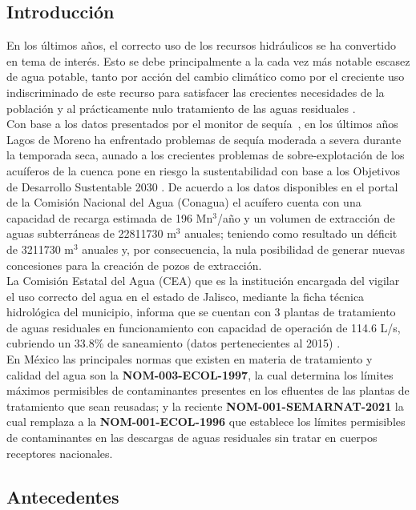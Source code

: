 \subsection*{Introducción}
En los últimos años, el correcto uso de los recursos hidráulicos se ha convertido en tema de interés. Esto se debe principalmente a la cada vez más notable escasez de agua potable, tanto por acción del cambio climático como por el creciente uso indiscriminado de este recurso para satisfacer las crecientes necesidades de la población y al prácticamente nulo tratamiento de las aguas residuales \emph{\citep{informeods2021, aa2030}}.\\
Con base a los datos presentados por el monitor de sequía~\emph{\citep{msm}}, en los últimos años Lagos de Moreno ha enfrentado problemas de sequía moderada a severa durante la temporada seca, aunado a los crecientes problemas de sobre-explotación de los acuíferos de la cuenca pone en riesgo la sustentabilidad con base a los Objetivos de Desarrollo Sustentable 2030 \emph{\citep{aa2030}}. De acuerdo a los datos disponibles en el portal de la Comisión Nacional del Agua (Conagua) \emph{\citep{acuiferolag}} el acuífero cuenta con una capacidad de recarga estimada de 196 Mn$^{3}$/año y un volumen de extracción de aguas subterráneas de 22811730 m$^{3}$ anuales; teniendo como resultado un déficit de 3211730 m$^{3}$ anuales y, por consecuencia, la nula posibilidad de generar nuevas concesiones para la creación de pozos de extracción.\\
La Comisión Estatal del Agua (CEA) que es la institución encargada del vigilar el uso correcto del agua en el estado de Jalisco, mediante la ficha técnica hidrológica del municipio, informa que se cuentan con 3 plantas de tratamiento de aguas residuales  en funcionamiento con capacidad de operación de 114.6 L/s, cubriendo un 33.8\% de saneamiento (datos pertenecientes al 2015) \emph{\citep{fichalagos}}.\\
En México las principales normas que existen en materia de tratamiento y calidad del agua son la \textbf{NOM-003-ECOL-1997}, la cual determina los límites máximos permisibles de contaminantes presentes en los efluentes de las plantas de tratamiento que sean reusadas; y la reciente \textbf{NOM-001-SEMARNAT-2021} la cual remplaza a la \textbf{NOM-001-ECOL-1996} que establece los límites permisibles de contaminantes en las descargas de aguas residuales sin tratar en cuerpos receptores nacionales.

\subsection*{Antecedentes}
